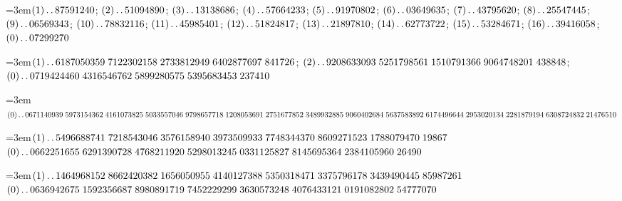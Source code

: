 \par\noindent\hangindent=3em\enspace $(1)\mathinner{.\,.}87591240$; $(2)\mathinner{.\,.}51094890$; $(3)\mathinner{.\,.}13138686$; $(4)\mathinner{.\,.}57664233$; $(5)\mathinner{.\,.}91970802$; $(6)\mathinner{.\,.}03649635$; $(7)\mathinner{.\,.}43795620$; $(8)\mathinner{.\,.}25547445$; $(9)\mathinner{.\,.}06569343$; $(10)\mathinner{.\,.}78832116$; $(11)\mathinner{.\,.}45985401$; $(12)\mathinner{.\,.}51824817$; $(13)\mathinner{.\,.}21897810$; $(14)\mathinner{.\,.}62773722$; $(15)\mathinner{.\,.}53284671$; $(16)\mathinner{.\,.}39416058$; $(0)\mathinner{.\,.}07299270$\par\smallskip

\par\noindent\hangindent=3em\enspace $(1)\mathinner{.\,.}6187050359\;\allowbreak 7122302158\;\allowbreak 2733812949\;\allowbreak 6402877697\;\allowbreak 841726$; $(2)\mathinner{.\,.}9208633093\;\allowbreak 5251798561\;\allowbreak 1510791366\;\allowbreak 9064748201\;\allowbreak 438848$; $(0)\mathinner{.\,.}0719424460\;\allowbreak 4316546762\;\allowbreak 5899280575\;\allowbreak 5395683453\;\allowbreak 237410$\par\smallskip

\par\noindent\hangindent=3em\enspace $(0)\mathinner{.\,.}0671140939\;\allowbreak 5973154362\;\allowbreak 4161073825\;\allowbreak 5033557046\;\allowbreak 9798657718\;\allowbreak 1208053691\;\allowbreak 2751677852\;\allowbreak 3489932885\;\allowbreak 9060402684\;\allowbreak 5637583892\;\allowbreak 6174496644\;\allowbreak 2953020134\;\allowbreak 2281879194\;\allowbreak 6308724832\;\allowbreak 21476510$\par\smallskip

\par\noindent\hangindent=3em\enspace $(1)\mathinner{.\,.}5496688741\;\allowbreak 7218543046\;\allowbreak 3576158940\;\allowbreak 3973509933\;\allowbreak 7748344370\;\allowbreak 8609271523\;\allowbreak 1788079470\;\allowbreak 19867$ $(0)\mathinner{.\,.}0662251655\;\allowbreak 6291390728\;\allowbreak 4768211920\;\allowbreak 5298013245\;\allowbreak 0331125827\;\allowbreak 8145695364\;\allowbreak 2384105960\;\allowbreak 26490$\par\smallskip

\par\noindent\hangindent=3em\enspace $(1)\mathinner{.\,.}1464968152\;\allowbreak 8662420382\;\allowbreak 1656050955\;\allowbreak 4140127388\;\allowbreak 5350318471\;\allowbreak 3375796178\;\allowbreak 3439490445\;\allowbreak 85987261$ $(0)\mathinner{.\,.}0636942675\;\allowbreak 1592356687\;\allowbreak 8980891719\;\allowbreak 7452229299\;\allowbreak 3630573248\;\allowbreak 4076433121\;\allowbreak 0191082802\;\allowbreak 54777070$\par\smallskip

